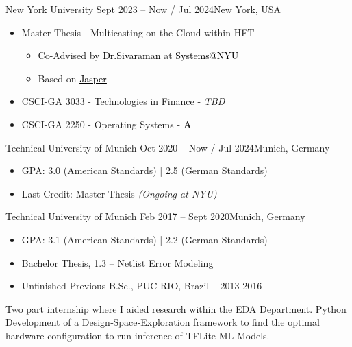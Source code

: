 \documentclass[10pt,a4paper,ragged2e,withhyper]{altacv}
\begin{document}
\begin{paracol}{2}

        {New York University}
        {Sept 2023 -- Now / Jul 2024}{New York, USA}
\begin{itemize}
\item Master Thesis - Multicasting on the Cloud within HFT 
    \begin{itemize}
        \item Co-Advised by \href{https://anirudhsk.github.io/}{{\textcolor{black}{\underline{Dr.Sivaraman}}}} at \href{https://news.cs.nyu.edu/}{{\textcolor{black}{\underline{Systems@NYU}}}}
        \item Based on \href{https://arxiv.org/abs/2402.09527}{{\textcolor{black}{\underline{Jasper}}}}
    \end{itemize}
\item CSCI-GA 3033  - Technologies in Finance - \textit{TBD}
\item CSCI-GA 2250  - Operating Systems - \textbf{A}
\end{itemize}

\divider

        {Technical University of Munich}
        {Oct 2020 -- Now / Jul 2024}{Munich, Germany}
\begin{itemize}
\item GPA: 3.0 (American Standards) | 2.5 (German Standards) 
\item Last Credit: Master Thesis \textit{(Ongoing at NYU)}
\end{itemize}
\divider

        {Technical University of Munich}
        {Feb 2017 -- Sept 2020}{Munich, Germany}
\begin{itemize}
\item GPA: 3.1 (American Standards) | 2.2 (German Standards)
\item Bachelor Thesis, 1.3 -- Netlist Error Modeling
\item Unfinished Previous B.Sc., PUC-RIO, Brazil -- 2013-2016
\end{itemize}


Two part internship where I aided research within the EDA Department. Python Development of a Design‑Space‑Exploration 
framework to find the optimal hardware configuration to run inference of TFLite ML Models.


\end{paracol}
\end{document}
